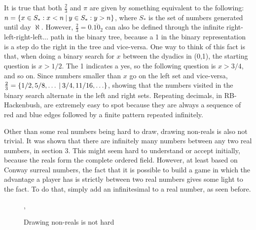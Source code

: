 It is true that both $\frac{2}{3}$ and $\pi$ are given by something equivalent to the following: $n = \mbox{$\{x \in S_*:x < n\:|\:y \in S_*:y>n\}$}$, where $S_*$ is the set of numbers generated until day $\aleph$. However, $\frac{2}{3}=0.\overline{10}_2$ can also be defined through the infinite right-left-right-left... path in the binary tree, because a 1 in the binary representation is a step do the right in the tree and vice-versa. One way to think of this fact is that, when doing a binary search for $x$ between the dyadics in (0,1), the starting question is $x > 1/2$. The 1 indicates a yes, so the following question is $x > 3/4$, and so on. Since numbers smaller than $x$ go on the left set and vice-versa, $\frac{2}{3} = \mbox{$\{1/2, 5/8, \ldots\:|\:3/4,11/16,\ldots\}$}$, showing that the numbers visited in the binary search alternate in the left and right sets. Repeating decimals, in RB-Hackenbush, are extremely easy to spot because they are always a sequence of red and blue edges followed by a finite pattern repeated infinitely.

Other than some real numbers being hard to draw, drawing non-reals is also not trivial. It was shown that there are infinitely many numbers between any two real numbers, in section 3. This might seem hard to understand or accept initially, because the reals form the complete ordered field. However, at least based on Conway surreal numbers, the fact that it is possible to build a game in which the advantage a player has is strictly between two real numbers gives some light to the fact. To do that, simply add an infinitesimal to a real number, as seen before.

\begin{figure}[H]
\begin{center}
	,
\end{center}
\caption{Drawing non-reals is not hard}
\end{figure}

